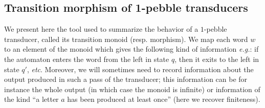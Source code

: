 \documentclass[sigplan,review,anonymous]{acmart}\settopmatter{printfolios=true,printccs=false,printacmref=false}
\theoremstyle{definition}
\theoremstyle{remark}
\begin{document}
\begin{comment}
    A regular function has at most linear growth, but its output may be smaller than that. Let us show that there is a dichotomy: either a regular function has linear or bounded output size. This is not very hard to see: intuitively, either there is an input word with a part that can be pumped and which produces something, and then the length of the output is linear in the number of times the loop is pumped; or there is no such part, which means that any pumpable part can be removed without changing the output length, hence the output size is bounded.
    This not very deep result will serve as a stepping stone for the main contribution of the article.
\end{comment}

\subsection{Transition morphism of 1-pebble transducers}
We present here the tool used to summarize the behavior of a $1$-pebble transducer, called its transition monoid (resp. morphism). We map each word $w$ to an element of the monoid which gives the following kind of information \textit{e.g.}: if the automaton enters the word from the left in state $q$, then it exits to the left in state $q'$, \textit{etc}.
Moreover, we will sometimes need to record information about the output produced in such a pass of the transducer; this information can be for instance the whole output (in which case the monoid is infinite) or information of the kind ``a letter $a$ has been produced at least once'' (here we recover finiteness).

  
   
\end{document}
